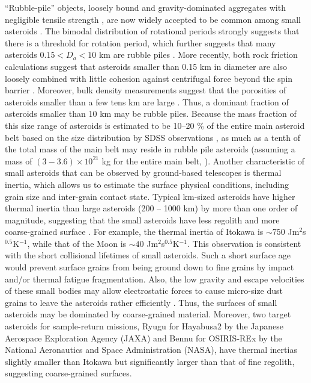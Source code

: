 \documentclass[3p,authoryear]{elsarticle}
\begin{document}
``Rubble-pile'' objects, loosely bound and gravity-dominated aggregates with negligible tensile strength \citep[e.g.][]{fujiwara1980}, are now
widely accepted to be common among small asteroids \citep[e.g.][]{richardson2002}. The bimodal distribution of rotational periods strongly suggests
that there is a threshold for rotation period, which further suggests that many asteroids $0.15<D_a<10$ km are rubble piles \citep{pravec2002}. More recently, both rock friction calculations suggest that asteroids smaller than 0.15 km in diameter are also loosely combined with little cohesion against
centrifugal force beyond the spin barrier \citep[e.g.][]{holsapple2007,scheeres2010,rozitis2014}. Moreover, bulk density measurements suggest that the porosities of asteroids smaller than a few tens km are large \citep{britt2002}. 
Thus, a dominant fraction of asteroids smaller than 10 km may be rubble piles. Because the mass fraction of this size range of asteroids is estimated to be 10--20 \% of the entire main asteroid belt based on the size distribution by SDSS observations \citep{demeo2013}, as much as a tenth of the total mass of the main belt may reside in rubble pile asteroids (assuming a mass of $(3-3.6)\times 10^{21}$ kg for the entire main belt, \citep{krasinsky2002, kuchynka2013}).
Another characteristic of small asteroids that can be observed by ground-based telescopes is thermal inertia, which allows us to estimate the surface physical conditions, including grain size and inter-grain contact state. Typical km-sized asteroids
have higher thermal inertia than large asteroids (200 -- 1000 km) by more than one order of magnitude, suggesting that the small asteroids have less regolith and more coarse-grained surface \citep{delbo2009}. For example, the thermal inertia of Itokawa is $\sim 750$ Jm$^2$s$^{0.5}$K$^{-1}$\citep{muller2005}, while that of the Moon is $\sim 40$ Jm$^2$s$^{0.5}$K$^{-1}$\citep{Keihm1984}.
This observation is consistent with the short collisional lifetimes of small asteroids. 
Such a short surface age would prevent surface grains from being ground down to fine grains by impact and/or thermal fatigue fragmentation. Also, the low gravity and escape velocities of these small bodies may allow electrostatic forces to cause micro-size dust grains to leave the asteroids rather efficiently \citep{lee1996,hartzell2011,nagao2011}.
Thus, the surfaces of small asteroids may be dominated by coarse-grained material.
Moreover, two target asteroids for sample-return missions, Ryugu for Hayabusa2 by the Japanese Aerospace Exploration Agency (JAXA) and Bennu for OSIRIS-REx by the National Aeronautics and Space Administration (NASA), have thermal inertias slightly smaller \citep{hasegawa2008,emery2014, mueller2016} than Itokawa but significantly larger than that of fine regolith, suggesting coarse-grained surfaces.
\end{document}
